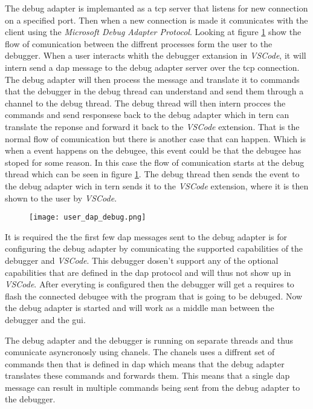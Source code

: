 
The debug adapter is implemanted as a \gls{tcp} server that listens for new connection on a specified port.
Then when a new connection is made it comunicates with the client using the \emph{Microsoft Debug Adapter Protocol}.
Looking at figure \ref{fig:userDAP} show the flow of comunication between the diffrent processes form the user to the debugger.
When a user interacts whith the debugger extansion in \emph{VSCode}, it will intern send a \acrshort{dap} message to the debug adapter server over the \gls{tcp} connection.
The debug adapter will then process the message and translate it to commands that the debugger in the debug thread can understand and send them through a channel to the debug thread.
The debug thread will then intern procces the commands and send responsese back to the debug adapter which in tern can translate the reponse and forward it back to the \emph{VSCode} extension.
That is the normal flow of comunication but there is another case that can happen.
Which is when a event happens on the debugee, this event could be that the debugee has stoped for some reason.
In this case the flow of comunication starts at the debug thread which can be seen in figure \ref{fig:userDAP}.
The debug thread then sends the event to the debug adapter wich in tern sends it to the \emph{VSCode} extension, where it is then shown to the user by \emph{VSCode}.


\begin{figure}[h]
    \centering
    \texttt{[image: user\_dap\_debug.png]}
    \label{fig:userDAP}
\end{figure}


It is required the the first few \acrshort{dap} messages sent to the debug adapter is for configuring the debug adapter by comunicating the supported capabilities of the debugger and \emph{VSCode}.
This debugger dosen't support any of the optional capabilities that are defined in the \acrshort{dap} protocol and will thus not show up in \emph{VSCode}.
After everyting is configured then the debugger will get a requires to flash the connected debugee with the program that is going to be debuged.
Now the debug adapter is started and will work as a middle man between the debugger and the \acrshort{gui}.


The debug adapter and the debugger is running on separate threads and thus comunicate asyncronosly using chanels.
The chanels uses a diffrent set of commands then that is defined in \acrshort{dap} which means that the debug adapter translates these commands and forwards them.
This means that a single \acrshort{dap} message can result in multiple commands being sent from the debug adapter to the debugger.


